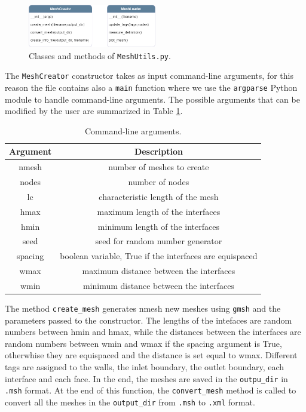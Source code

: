 \documentclass[11pt,a4paper]{article}
\begin{document}
\begin{figure}[H]
    \centering
    \includegraphics[width=0.5\textwidth]{Images/mesh_class.png}
    \caption{Classes and methods of \texttt{MeshUtils.py}.}
    \label{mesh_class}
\end{figure}

The \texttt{MeshCreator} constructor takes as input command-line arguments, for this reason the file contains also a \texttt{main} function where we use the \texttt{argparse} Python module to handle command-line arguments. 
The possible arguments that can be modified by the user are summarized in Table \ref{args}.

\begin{table}[H]
    \centering
    \begin{tabular}{|c|c|}
        \hline
        \textbf{Argument} & \textbf{Description} \\
        \hline
        nmesh & number of meshes to create \\
        nodes & number of nodes \\
        lc & characteristic length of the mesh \\
        hmax & maximum length of the interfaces \\
        hmin & minimum length of the interfaces \\
        seed & seed for random number generator \\
        spacing & boolean variable, True if the interfaces are equispaced \\
        wmax & maximum distance between the interfaces \\
        wmin & minimum distance between the interfaces \\
        \hline   
    \end{tabular}
    \caption{Command-line arguments.}
    \label{args}
\end{table}

The method \texttt{create\_mesh} generates nmesh new meshes using \texttt{gmsh} and the parameters passed to the constructor. The lengths of the intefaces are random numbers between hmin and hmax, while the distances between the interfaces are random numbers between wmin and wmax if the spacing argument is True, otherwhise they are equispaced and the distance is set equal to wmax. Different tags are assigned to the walls, the inlet boundary, the outlet boundary, each interface and each face. In the end, the meshes are saved in the \texttt{outpu\_dir} in \texttt{.msh} format.
At the end of this function, the \texttt{convert\_mesh} method is called to convert all the meshes in the \texttt{output\_dir} from \texttt{.msh} to \texttt{.xml} format. 
\end{document}
